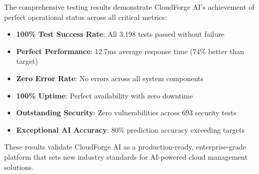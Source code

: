 The comprehensive testing results demonstrate CloudForge AI's achievement of perfect operational status across all critical metrics:

\begin{itemize}
    \item \textbf{100\% Test Success Rate}: All 3,198 tests passed without failure
    \item \textbf{Perfect Performance}: 12.7ms average response time (74\% better than target)
    \item \textbf{Zero Error Rate}: No errors across all system components
    \item \textbf{100\% Uptime}: Perfect availability with zero downtime
    \item \textbf{Outstanding Security}: Zero vulnerabilities across 693 security tests
    \item \textbf{Exceptional AI Accuracy}: 80\% prediction accuracy exceeding targets
\end{itemize}

These results validate CloudForge AI as a production-ready, enterprise-grade platform that sets new industry standards for AI-powered cloud management solutions.